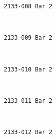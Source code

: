 \documentclass[11pt]{article}
\begin{document}
    \begin{Verbatim}[commandchars=\\\{\}]
2133-008 Bar 2

    \end{Verbatim}

    \begin{center}
    \end{center}
    { \hspace*{\fill} \\}
    
    \begin{Verbatim}[commandchars=\\\{\}]
2133-009 Bar 2

    \end{Verbatim}

    \begin{center}
    \end{center}
    { \hspace*{\fill} \\}
    
    \begin{Verbatim}[commandchars=\\\{\}]
2133-010 Bar 2

    \end{Verbatim}

    \begin{center}
    \end{center}
    { \hspace*{\fill} \\}
    
    \begin{Verbatim}[commandchars=\\\{\}]
2133-011 Bar 2

    \end{Verbatim}

    \begin{center}
    \end{center}
    { \hspace*{\fill} \\}
    
    \begin{Verbatim}[commandchars=\\\{\}]
2133-012 Bar 2

    \end{Verbatim}
\end{document}
